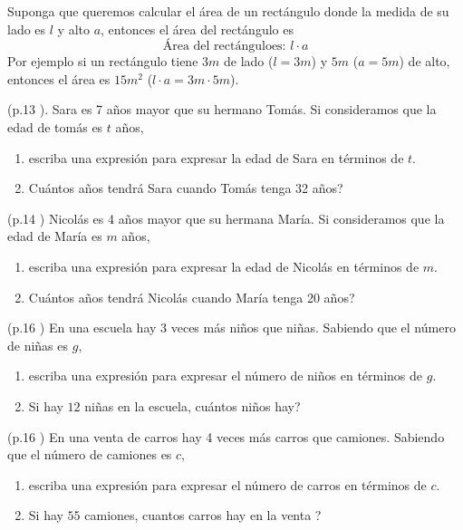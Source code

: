 \begin{ejemplo}
	Suponga que queremos calcular el área de un rectángulo donde la medida de su lado es  $l$ y alto $a$, entonces el área del rectángulo es
	\[
	\text{Área del rectánguloes:  }l\cdot a
	\]	
	Por ejemplo si un rectángulo tiene $3m$ de lado ($l=3m$) y $5m$ ($a=5m$) de alto, entonces el área es $15m^2$ ($l\cdot a=3m \cdot 5m$).
\end{ejemplo}

\begin{ejemplo} (p.13 \cite{Dimensions_Math_6B}). Sara es 7 años mayor que su hermano Tomás. Si consideramos que la edad de tomás es $t$ años,
	\begin{enumerate}[label=\Alph*)]
		\item escriba una expresión para expresar la edad de Sara en términos de $t$.
		\item Cuántos años tendrá Sara cuando Tomás tenga 32 años?
	\end{enumerate}
\end{ejemplo}

\begin{exer} (p.14 \cite{Dimensions_Math_6B})
	Nicolás es 4 años mayor que su hermana María. Si consideramos que la edad de María es $m$ años,
	\begin{enumerate}[label=\Alph*)]
		\item escriba una expresión para expresar la edad de Nicolás en términos de $m$.
		\item Cuántos años tendrá Nicolás cuando María tenga 20 años?
	\end{enumerate}		
\end{exer}

\begin{ejemplo} (p.16 \cite{Dimensions_Math_6B})
	En una escuela hay 3 veces más niños que niñas. Sabiendo que el número de niñas es $g$,
	\begin{enumerate}[label=\Alph*)]
		\item escriba una expresión para expresar el número de niños en términos de $g$.
		\item Si hay $12$ niñas en la escuela, cuántos niños hay?
	\end{enumerate}
\end{ejemplo}

\begin{exer} (p.16 \cite{Dimensions_Math_6B})
	En una venta de carros hay 4 veces más carros que camiones. Sabiendo que el número de camiones es $c$,
	\begin{enumerate}[label=\Alph*)]
		\item escriba una expresión para expresar el número de carros en términos de $c$.
		\item Si hay $55$ camiones, cuantos carros hay en la venta ?
	\end{enumerate}
\end{exer}

